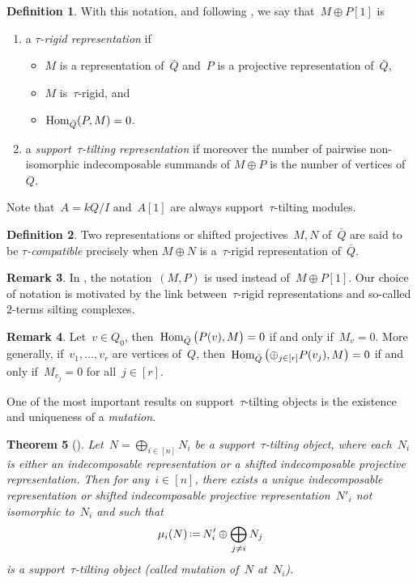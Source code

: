 \documentclass{amsart}
\newtheorem{theorem}{Theorem}[part]
\theoremstyle{definition}
\newtheorem{definition}[theorem]{Definition}
\newtheorem{remark}[theorem]{Remark}
\newcommand{\eqdef}{\mbox{\,\raisebox{0.2ex}{\scriptsize\ensuremath{\mathrm:}}\ensuremath{=}\,}} %
\newcommand{\darkblue}{\color{darkblue}} %
\newcommand{\defn}[1]{\textsl{\darkblue #1}} %
\newcommand{\Hom}[1]{\operatorname{{\rm Hom}}_{#1}}
\begin{document}
\begin{definition}
\label{def: tau-rigid and stautilt}
With this notation, and following \cite{AdachiIyamaReiten}, we say that~$M\oplus P[1]$ is
\begin{enumerate}
 \item a \defn{$\tau$-rigid representation} if
   \begin{itemize}
     \item $M$ is a representation of~$\bar Q$ and~$P$ is a projective representation of~$\bar Q$,
     \item $M$ is~$\tau$-rigid, and
     \item $\Hom{\bar Q}(P,M) = 0$.
   \end{itemize}
 \item a \defn{support~$\tau$-tilting representation} if moreover the number of pairwise non-isomorphic indecomposable summands of $M\oplus P$ is the number of vertices of~$Q$.
\end{enumerate}
Note that~$A = kQ/I$ and~$A[1]$ are always support~$\tau$-tilting modules.
\end{definition}

\begin{definition}\label{def: tau-compatibility}
 Two representations or shifted projectives~$M, N$ of~$\bar Q$ are said to be \defn{$\tau$-compatible} precisely when $M\oplus N$ is a~$\tau$-rigid representation of~$\bar Q$.
\end{definition}


\begin{remark}
In \cite{AdachiIyamaReiten}, the notation~$(M,P)$ is used instead of~$M\oplus P[1]$.  Our choice of notation is motivated by the link between~$\tau$-rigid representations and so-called $2$-terms silting complexes.
\end{remark}

\begin{remark}
Let~$v\in Q_0$, then~$\Hom{\bar Q} \big( P(v), M \big) = 0$ if and only if~$M_v=0$. More generally, if~$v_1, \ldots, v_r$ are vertices of~$Q$, then~$\Hom{\bar Q}\big( {\oplus_{j \in [r]} P(v_j)}, M \big) = 0$ if and only if~$M_{v_j}=0$ for all~$j \in [r]$. 
\end{remark}

One of the most important results on support~$\tau$-tilting objects is the existence and uniqueness of a \defn{mutation}.  

\begin{theorem}[\cite{AdachiIyamaReiten}]\label{thm: mutation of stautilts}
Let~$N = \bigoplus_{i \in [n]} N_i$ be a support~$\tau$-tilting object, where each~$N_i$ is either an indecomposable representation or a shifted indecomposable projective representation.
Then for any~${i \in [n]}$, there exists a unique indecomposable representation or shifted indecomposable projective representation~$N'_i$ not isomorphic to~$N_i$ and such that
\[
\mu_i(N) \eqdef N'_i \oplus \bigoplus_{j\neq i} N_j
\]
is a support~$\tau$-tilting object (called mutation of~$N$ at~$N_i$).
\end{theorem}
\end{document}
